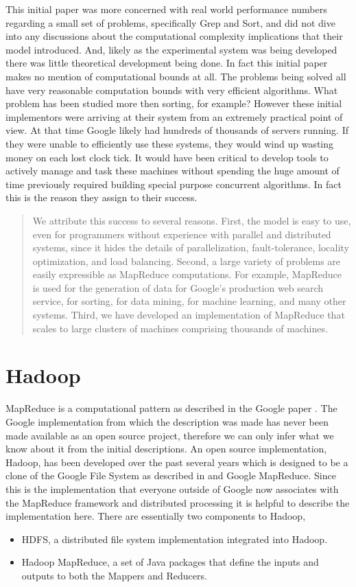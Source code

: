 \documentclass{article}
\begin{document}
This initial paper was more concerned with real world performance numbers regarding a small set of problems, specifically Grep and Sort, and did not dive into any discussions about the computational complexity implications that their model introduced. And, likely as the experimental system was being developed there was little theoretical development being done. In fact this initial paper makes no mention of computational bounds at all. The problems being solved all have very reasonable computation bounds with very efficient algorithms. What problem has been studied more then sorting, for example? However these initial implementors were arriving at their system from an extremely practical point of view. At that time Google likely had hundreds of thousands of servers running. If they were unable to efficiently use these systems, they would wind up wasting money on each lost clock tick. It would have been critical to develop tools to actively manage and task these machines without spending the huge amount of time previously required building special purpose concurrent algorithms. In fact this is the reason they assign to their success. 

\begin{quotation}
We attribute this success to several reasons. First, the model is easy to use, even for programmers without experience with parallel and distributed systems, since it hides the details of parallelization, fault-tolerance, locality optimization, and load balancing. Second, a large variety of problems are easily expressible as MapReduce computations. For example, MapReduce is used for the generation of data for Google's production web search service, for sorting, for data mining, for machine learning, and many other systems. Third, we have developed an implementation of MapReduce that scales to large clusters of machines comprising thousands of machines.
\end{quotation}

\section{Hadoop}
MapReduce is a computational pattern as described in the Google paper \cite{mapreduce}. The Google implementation from which the description was made has never been made available as an open source project, therefore we can only infer what we know about it from the initial descriptions. An open source implementation, Hadoop, has been developed over the past several years which is designed to be a clone of the Google File System as described in \cite{gfs} and Google MapReduce. Since this is the implementation that everyone outside of Google now associates with the MapReduce framework and distributed processing it is helpful to describe the implementation here. There are essentially two components to Hadoop, 
\begin{itemize}
\item HDFS, a distributed file system implementation integrated into Hadoop. 
\item Hadoop MapReduce, a set of Java packages that define the inputs and outputs to both the Mappers and Reducers. 
\end{itemize}
\end{document}
